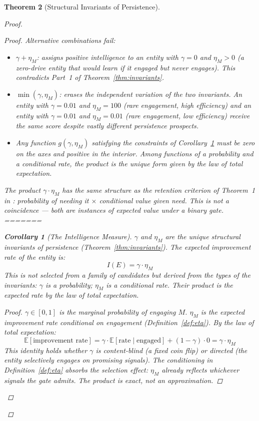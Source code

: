 \documentclass[11pt]{article}
\newtheorem{theorem}{Theorem}
\newtheorem{corollary}[theorem]{Corollary}
\theoremstyle{definition}
\theoremstyle{remark}
\begin{document}
\begin{theorem}[Structural Invariants of Persistence]
\begin{proof}
\begin{proof}
Alternative combinations fail:
\begin{itemize}
\item $\gamma + \eta_M$: assigns positive intelligence to an entity with
      $\gamma = 0$ and $\eta_M > 0$ (a zero-drive entity that would learn
      if it engaged but never engages). This contradicts Part~1 of
      Theorem~\ref{thm:invariants}.
\item $\min(\gamma, \eta_M)$: erases the independent variation of the two
      invariants. An entity with $\gamma = 0.01$ and $\eta_M = 100$ (rare
      engagement, high efficiency) and an entity with $\gamma = 0.01$ and
      $\eta_M = 0.01$ (rare engagement, low efficiency) receive the
      same score despite vastly different persistence prospects.
\item Any function $g(\gamma, \eta_M)$ satisfying the constraints of
      Corollary~\ref{cor:measure} must be zero on the axes and positive
      in the interior. Among functions of a probability and a
      conditional rate, the product is the unique form given by the law
      of total expectation.
\end{itemize}

The product $\gamma \cdot \eta_M$ has the same structure as the retention
criterion of Theorem~1 in \cite{McCarthy2026c}: probability of needing
it $\times$ conditional value given need. This is not a coincidence
--- both are instances of expected value under a binary gate.
=======
\begin{corollary}[The Intelligence Measure]
\label{cor:measure}
$\gamma$ and $\eta_M$ are the unique structural invariants of persistence
(Theorem~\ref{thm:invariants}). The expected improvement rate of the
entity is:
\[
I(E) = \gamma \cdot \eta_M
\]
This is not selected from a family of candidates but derived from the
types of the invariants: $\gamma$ is a probability; $\eta_M$ is a
conditional rate. Their product is the expected rate by the law of
total expectation.
\end{corollary}

\begin{proof}
$\gamma \in [0, 1]$ is the marginal probability of engaging $M$.
$\eta_M$ is the expected improvement rate \emph{conditional on
engagement} (Definition~\ref{def:eta}). By the law of total
expectation:
\[
\mathbb{E}[\text{improvement rate}]
= \gamma \cdot \mathbb{E}[\text{rate} \mid \text{engaged}]
+ (1 - \gamma) \cdot 0
= \gamma \cdot \eta_M
\]
This identity holds whether $\gamma$ is content-blind (a fixed coin
flip) or directed (the entity selectively engages on promising
signals). The conditioning in Definition~\ref{def:eta} absorbs the
selection effect: $\eta_M$ already reflects whichever signals the gate
admits. The product is exact, not an approximation.


\end{proof}
\end{proof}
\end{proof}
\end{theorem}
\end{document}
